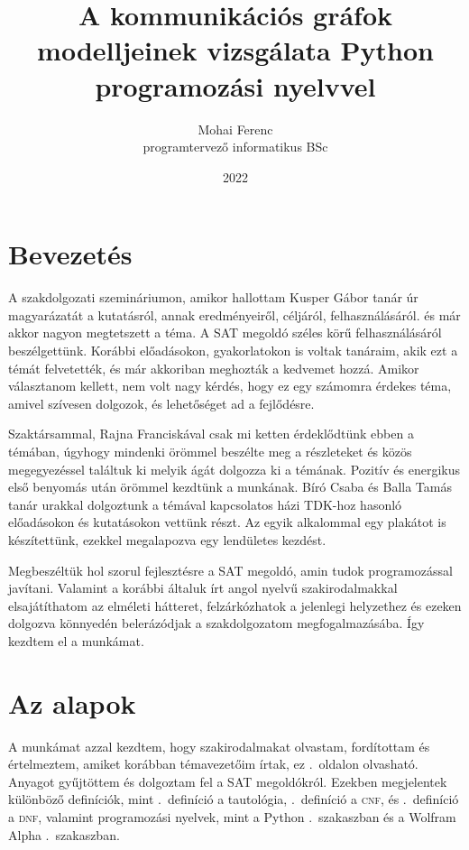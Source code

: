\documentclass[
]{thesis-ekf}
\theoremstyle{definition}
\theoremstyle{remark}
\begin{document}
	\title{A kommunikációs gráfok modelljeinek vizsgálata Python programozási nyelvvel}
	\author{Mohai Ferenc\\programtervező informatikus BSc}
	\date{2022}
	
	\maketitle
	\tableofcontents
	
	\chapter*{Bevezetés}
	A szakdolgozati szemináriumon, amikor hallottam Kusper Gábor tanár úr magyarázatát a kutatásról, annak eredményeiről, céljáról, felhasználásáról. és már akkor nagyon megtetszett a téma. A SAT megoldó széles körű felhasználásáról beszélgettünk. Korábbi előadásokon, gyakorlatokon is voltak tanáraim, akik ezt a témát felvetették, és már akkoriban meghozták a kedvemet hozzá. Amikor választanom kellett, nem volt nagy kérdés, hogy ez egy számomra érdekes téma, amivel szívesen dolgozok, és lehetőséget ad a fejlődésre.

	Szaktársammal, Rajna Franciskával csak mi ketten érdeklődtünk ebben a témában, úgyhogy mindenki örömmel beszélte meg a részleteket és közös megegyezéssel találtuk ki melyik ágát dolgozza ki a témának. Pozitív és energikus első benyomás után örömmel kezdtünk a munkának. Bíró Csaba és Balla Tamás tanár urakkal dolgoztunk a témával kapcsolatos házi TDK-hoz hasonló előadásokon és kutatásokon \cite{am} vettünk részt. Az egyik alkalommal egy plakátot is készítettünk, ezekkel megalapozva egy lendületes kezdést.
	
	Megbeszéltük hol szorul fejlesztésre a SAT megoldó, amin tudok programozással javítani. Valamint a korábbi általuk írt angol nyelvű szakirodalmakkal elsajátíthatom az elméleti hátteret, felzárkózhatok a jelenlegi helyzethez és ezeken dolgozva könnyedén belerázódjak a szakdolgozatom megfogalmazásába. Így kezdtem el a munkámat.
	
	\chapter{Az alapok}
	
	A munkámat azzal kezdtem, hogy szakirodalmakat olvastam, fordítottam és értelmeztem, amiket korábban témavezetőim írtak, ez .~oldalon olvasható. Anyagot gyűjtöttem és dolgoztam fel a SAT megoldókról. Ezekben megjelentek különböző definíciók, mint .~definíció a tautológia, .~definíció a \textsc{cnf}, és .~definíció a \textsc{dnf}, valamint programozási nyelvek, mint a Python .~szakaszban és a Wolfram Alpha .~szakaszban.
		
\end{document}
